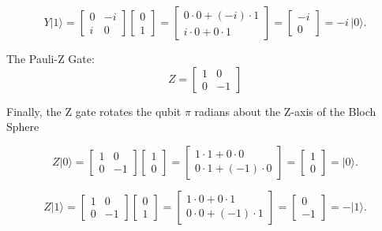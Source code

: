 \documentclass[12pt]{article}
\begin{document}
$$
Y \vert 1 \rangle = 
\begin{bmatrix} 0 & -i \\ i & 0 \end{bmatrix}
\begin{bmatrix} 0 \\ 1 \end{bmatrix}
=
\begin{bmatrix} 0\cdot 0 + (-i)\cdot 1 \\ i\cdot 0 + 0\cdot 1 \end{bmatrix}
=
\begin{bmatrix} -i \\ 0 \end{bmatrix}
= -i\, \vert 0 \rangle.
$$

The Pauli-Z Gate:
$$
Z = \begin{bmatrix}
1 & 0 \\
0 & -1
\end{bmatrix}
$$

Finally, the Z gate rotates the qubit $\pi$ radians about the Z-axis of the Bloch Sphere

$$
Z \vert 0 \rangle = 
\begin{bmatrix} 1 & 0 \\ 0 & -1 \end{bmatrix}
\begin{bmatrix} 1 \\ 0 \end{bmatrix}
=
\begin{bmatrix} 1\cdot 1 + 0\cdot 0 \\ 0\cdot 1 + (-1)\cdot 0 \end{bmatrix}
=
\begin{bmatrix} 1 \\ 0 \end{bmatrix}
= \vert 0 \rangle.
$$

$$
Z \vert 1 \rangle = 
\begin{bmatrix} 1 & 0 \\ 0 & -1 \end{bmatrix}
\begin{bmatrix} 0 \\ 1 \end{bmatrix}
=
\begin{bmatrix} 1\cdot 0 + 0\cdot 1 \\ 0\cdot 0 + (-1)\cdot 1 \end{bmatrix}
=
\begin{bmatrix} 0 \\ -1 \end{bmatrix}
= -\vert 1 \rangle.
$$
\end{document}
